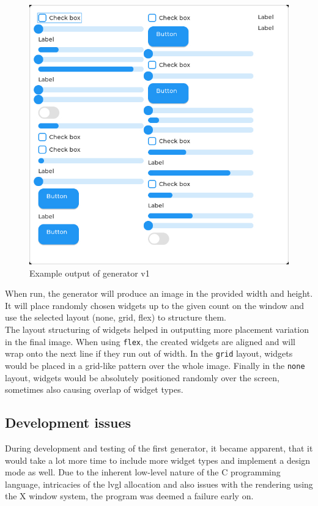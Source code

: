 \documentclass[Bachelor, BIC, english, fhCitStyle, IEEE]{BASE/twbook} %
\def\code#1{\texttt{#1}}
\begin{document}
\begin{figure}
    \caption{Example output of generator v1}
    \centering
    \includegraphics[width=\textwidth]{generator_v1_example.jpg}
\end{figure}
When run, the generator will produce an image in the provided width and height. It will place randomly chosen widgets up to the given count on the window and use the selected layout (none, grid, flex) to structure them.
\\
The layout structuring of widgets helped in outputting more placement variation in the final image. When using \code{flex}, the created widgets are aligned and will wrap onto the next line if they run out of width. In the \code{grid} layout, widgets would be placed in a grid-like pattern over the whole image. Finally in the \code{none} layout, widgets would be absolutely positioned randomly over the screen, sometimes also causing overlap of widget types.
\clearpage
\subsection{Development issues}
During development and testing of the first generator, it became apparent, that it would take a lot more time to include more widget types and implement a design mode as well. Due to the inherent low-level nature of the C programming language, intricacies of the \ac{lvgl} allocation and also issues with the rendering using the X window system, the program was deemed a failure early on.
\end{document}
